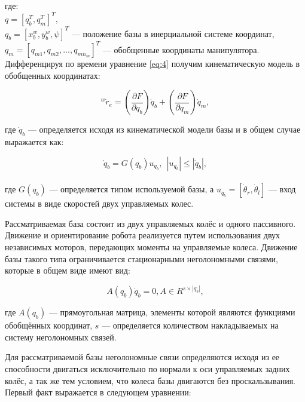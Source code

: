 \documentclass[14pt, a4paper]{extreport}
\begin{document}
\noindent
где:\\[3mm]
$q = [q_b^T,q_m^T]^T,$\\[3mm]
$q_b = [x^w_b, y^w_b, \psi]^T$ --- положение базы в инерциальной системе координат,\\[3mm]
$q_m = [q_{m1}, q_{m2}, ..., q_{mn_m}]^T$ --- обобщенные координаты манипулятора.\\[2mm]



Дифференцируя по времени уравнение \ref{eq:4} получим кинематическую модель в обобщенных координатах:

\begin{equation}
{^w\dot{r}_e} = \left(\frac{\partial F}{\partial q_b}\right)\dot{q}_b + \left(\frac{\partial F}{\partial q_m}\right)\dot{q}_m ,
\tag{5} \label{eq:5}
\end{equation}

\noindent
где $\dot{q}_b$ --- определяется исходя из кинематической модели базы и в общем случае выражается как:

\begin{equation}
\dot{q}_b = G(q_b)u_{q_b}, \ \ |u_{q_b}| \leqslant |\dot{q}_b|\!,
\tag{6} \label{eq:6}
\end{equation}
\ \\
\noindent
где $G(q_b)$ --- определяется типом используемой базы, а $u_{q_b} = [\dot{\theta}_r, \dot{\theta}_l]$ --- вход системы в виде скоростей двух управляемых колес.

Рассматриваемая база состоит из двух управляемых колёс и одного пассивного. Движение и ориентирование робота реализуется путем использования двух независимых моторов, передающих моменты на управляемые колеса. Движение базы такого типа ограничивается стационарными неголономными связями, которые в общем виде имеют вид:

\begin{equation}
A(q_b)\dot{q}_b = 0, A \in R^{s\times|q_b|},
\tag{7} \label{eq:7}
\end{equation}

\noindent
где $A(q_b)$ --- прямоугольная матрица, элементы которой являются функциями обобщённых координат, $s$ --- определяется количеством накладываемых на систему неголономных связей.

Для рассматриваемой базы неголономные связи определяются исходя из ее способности двигаться исключительно по нормали к оси управляемых задних колёс, а так же тем условием, что колеса базы двигаются без проскальзывания. Первый факт выражается в следующем уравнении:
\end{document}
